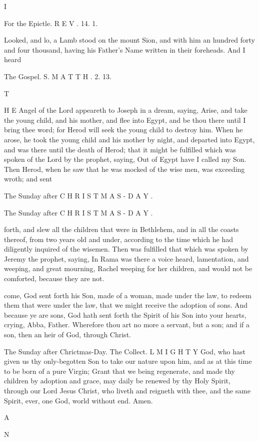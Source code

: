 I

For the Epictle. R E V . 14. 1.

Looked, and lo, a Lamb stood on the mount Sion, and with him an hundred forty and four thousand, having his Father's Name written in their foreheads. And I heard

The Gospel. S. M A T T H . 2. 13.

T

H E Angel of the Lord appeareth to Joseph in a dream, saying, Arise, and take the young child, and his mother, and flee into Egypt, and be thou there until I bring thee word; for Herod will seek the young child to destroy him. When he arose, he took the young child and his mother by night, and departed into Egypt, and was there until the death of Herod; that it might be fulfilled which was spoken of the Lord by the prophet, saying, Out of Egypt have I called my Son. Then Herod, when he saw that he was mocked of the wise men, was exceeding wroth; and sent

The Sunday after C H R I S T M A S - D A Y .

The Sunday after C H R I S T M A S - D A Y .

forth, and slew all the children that were in Bethlehem, and in all the coasts thereof, from two years old and under, according to the time which he had diligently inquired of the wisemen. Then was fulfilled that which was spoken by Jeremy the prophet, saying, In Rama was there a voice heard, lamentation, and weeping, and great mourning, Rachel weeping for her children, and would not be comforted, because they are not.

come, God sent forth his Son, made of a woman, made under the law, to redeem them that were under the law, that we might receive the adoption of sons. And because ye are sons, God hath sent forth the Spirit of his Son into your hearts, crying, Abba, Father. Wherefore thou art no more a servant, but a son; and if a son, then an heir of God, through Christ.

The Sunday after Chrictmas-Day. The Collect. L M I G H T Y God, who hast given us thy only-begotten Son to take our nature upon him, and as at this time to be born of a pure Virgin; Grant that we being regenerate, and made thy children by adoption and grace, may daily be renewed by thy Holy Spirit, through our Lord Jesus Christ, who liveth and reigneth with thee, and the same Spirit, ever, one God, world without end. Amen.

A

N

